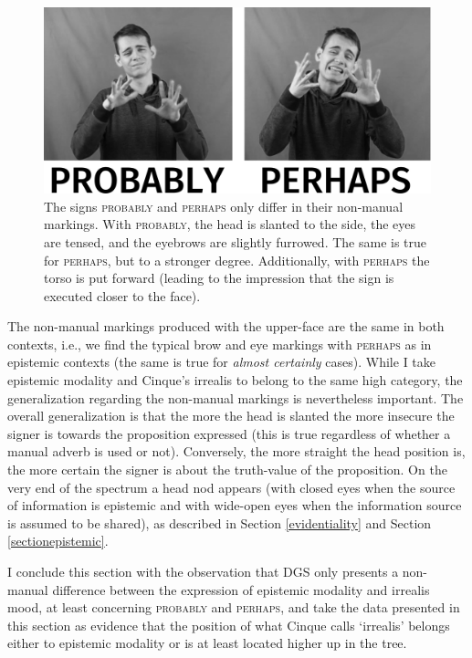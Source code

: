 \begin{figure}[bt]
\centering
	\includegraphics[width=1.0\textwidth]{probablyperhaps2sw.jpg}
	\caption{The signs \textsc{probably} and \textsc{perhaps} only differ in their non-manual markings. With \textsc{probably}, the head is slanted to the side, the eyes are tensed, and the eyebrows are slightly furrowed. The same is true for \textsc{perhaps}, but to a stronger degree. Additionally, with \textsc{perhaps} the torso is put forward (leading to the impression that the sign is executed closer to the face).}
	\label{fig:probablyperhaps}
\end{figure}

The non-manual markings produced with the upper-face are the same in both contexts, i.e., we find the typical brow and eye markings with \textsc{perhaps} as in epistemic contexts (the same is true for \textit{almost certainly} cases). While I take epistemic modality and Cinque's irrealis to belong to the same high category, the generalization regarding the non-manual markings is nevertheless important. The overall generalization is that the more the head is slanted the more insecure the signer is towards the proposition expressed (this is true regardless of whether a manual adverb is used or not). Conversely, the more straight the head position is, the more certain the signer is about the truth-value of the proposition. On the very end of the spectrum a head nod appears (with closed eyes when the source of information is epistemic and with wide-open eyes when the information source is assumed to be shared), as described in Section \ref{evidentiality} and Section \ref{sectionepistemic}.

I conclude this section with the observation that DGS only presents a non-manual difference between the expression of epistemic modality and irrealis mood, at least concerning \textsc{probably} and \textsc{perhaps}, and take the data presented in this section as evidence that the position of what Cinque calls `irrealis' belongs either to epistemic modality or is at least located higher up in the tree. 

